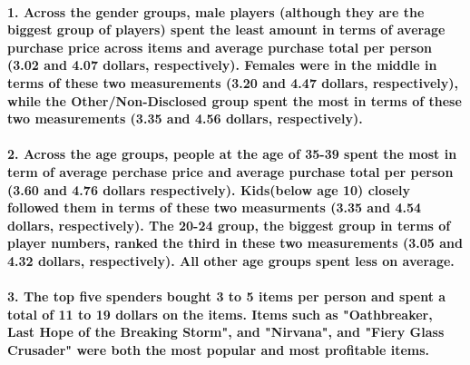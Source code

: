 \documentclass[11pt]{article}
\begin{document}
\paragraph{1. Across the gender groups, male players (although they are
the biggest group of players) spent the least amount in terms of average
purchase price across items and average purchase total per person (3.02
and 4.07 dollars, respectively). Females were in the middle in terms of
these two measurements (3.20 and 4.47 dollars, respectively), while the
Other/Non-Disclosed group spent the most in terms of these two
measurements (3.35 and 4.56 dollars,
respectively).}\label{across-the-gender-groups-male-players-although-they-are-the-biggest-group-of-players-spent-the-least-amount-in-terms-of-average-purchase-price-across-items-and-average-purchase-total-per-person-3.02-and-4.07-dollars-respectively.-females-were-in-the-middle-in-terms-of-these-two-measurements-3.20-and-4.47-dollars-respectively-while-the-othernon-disclosed-group-spent-the-most-in-terms-of-these-two-measurements-3.35-and-4.56-dollars-respectively.}

\paragraph{2. Across the age groups, people at the age of 35-39 spent
the most in term of average perchase price and average purchase total
per person (3.60 and 4.76 dollars respectively). Kids(below age 10)
closely followed them in terms of these two measurments (3.35 and 4.54
dollars, respectively). The 20-24 group, the biggest group in terms of
player numbers, ranked the third in these two measurements (3.05 and
4.32 dollars, respectively). All other age groups spent less on
average.}\label{across-the-age-groups-people-at-the-age-of-35-39-spent-the-most-in-term-of-average-perchase-price-and-average-purchase-total-per-person-3.60-and-4.76-dollars-respectively.-kidsbelow-age-10-closely-followed-them-in-terms-of-these-two-measurments-3.35-and-4.54-dollars-respectively.-the-20-24-group-the-biggest-group-in-terms-of-player-numbers-ranked-the-third-in-these-two-measurements-3.05-and-4.32-dollars-respectively.-all-other-age-groups-spent-less-on-average.}

\paragraph{3. The top five spenders bought 3 to 5 items per person and
spent a total of 11 to 19 dollars on the items. Items such as
"Oathbreaker, Last Hope of the Breaking Storm", and "Nirvana", and
"Fiery Glass Crusader" were both the most popular and most profitable
items.}\label{the-top-five-spenders-bought-3-to-5-items-per-person-and-spent-a-total-of-11-to-19-dollars-on-the-items.-items-such-as-oathbreaker-last-hope-of-the-breaking-storm-and-nirvana-and-fiery-glass-crusader-were-both-the-most-popular-and-most-profitable-items.}


    
    
    
    
\end{document}
